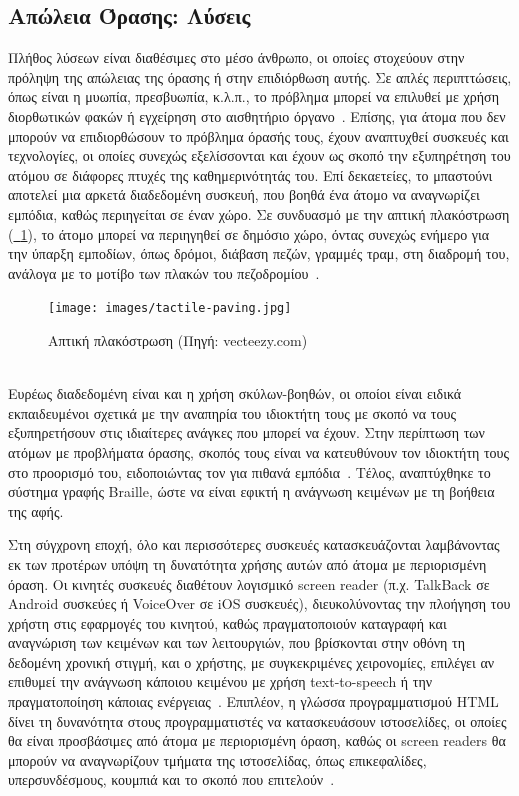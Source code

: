 \subsection{Απώλεια Όρασης: Λύσεις}\label{subsec:visionSolutions}
Πλήθος λύσεων είναι διαθέσιμες στο μέσο άνθρωπο, οι οποίες στοχεύουν στην πρόληψη της απώλειας της όρασης ή στην επιδιόρθωση αυτής. Σε απλές περιπττώσεις, όπως είναι η μυωπία, πρεσβυωπία, κ.λ.π., το πρόβλημα μπορεί να επιλυθεί με χρήση διορθωτικών φακών ή εγχείρηση στο αισθητήριο όργανο~\cite{worldhealthorganization_2023_blindness}. Επίσης, για άτομα που δεν μπορούν να επιδιορθώσουν το πρόβλημα όρασής τους, έχουν αναπτυχθεί συσκευές και τεχνολογίες, οι οποίες συνεχώς εξελίσσονται και έχουν ως σκοπό την εξυπηρέτηση του ατόμου σε διάφορες πτυχές της καθημερινότητάς του. Επί δεκαετείες, το μπαστούνι αποτελεί μια αρκετά διαδεδομένη συσκευή, που βοηθά ένα άτομο να αναγνωρίζει εμπόδια, καθώς περιηγείται σε έναν χώρο. Σε συνδυασμό με την απτική πλακόστρωση (\hyperref[fig:tactile_paving]{\schema~\ref*{fig:tactile_paving}}), το άτομο μπορεί να περιηγηθεί σε δημόσιο χώρο, όντας συνεχώς ενήμερο για την ύπαρξη εμποδίων, όπως δρόμοι, διάβαση πεζών, γραμμές τραμ, στη διαδρομή του, ανάλογα με το μοτίβο των πλακών του πεζοδρομίου~\cite{mashiata_2022_towards}.
\begin{figure}[!h]
  \centering
  \texttt{[image: images/tactile-paving.jpg]}
  \caption{Απτική πλακόστρωση {\footnotesize(Πηγή: vecteezy.com)}}\label{fig:tactile_paving}
\end{figure}\\
Ευρέως διαδεδομένη είναι και η χρήση σκύλων-βοηθών, οι οποίοι είναι ειδικά εκπαιδευμένοι σχετικά με την αναπηρία του ιδιοκτήτη τους με σκοπό να τους εξυπηρετήσουν στις ιδιαίτερες ανάγκες που μπορεί να έχουν. Στην περίπτωση των ατόμων με προβλήματα όρασης, σκοπός τους είναι να κατευθύνουν τον ιδιοκτήτη τους στο προορισμό του, ειδοποιώντας τον για πιθανά εμπόδια~\cite{illinoisuniversitylibrary_2013_libguides}. Τέλος, αναπτύχθηκε το σύστημα γραφής Braille, ώστε να είναι εφικτή η ανάγνωση κειμένων με τη βοήθεια της αφής.

Στη σύγχρονη εποχή, όλο και περισσότερες συσκευές κατασκευάζονται λαμβάνοντας εκ των προτέρων υπόψη τη δυνατότητα χρήσης αυτών από άτομα με περιορισμένη όραση. Οι κινητές συσκευές διαθέτουν λογισμικό screen reader (π.χ. TalkBack σε Android συσκεύες ή VoiceOver σε iOS συσκευές), διευκολύνοντας την πλοήγηση του χρήστη στις εφαρμογές του κινητού, καθώς πραγματοποιούν καταγραφή και αναγνώριση των κειμένων και των λειτουργιών, που βρίσκονται στην οθόνη τη δεδομένη χρονική στιγμή, και ο χρήστης, με συγκεκριμένες χειρονομίες, επιλέγει αν επιθυμεί την ανάγνωση κάποιου κειμένου με χρήση text-to-speech ή την πραγματοποίηση κάποιας ενέργειας~\cite{americanfoundationfortheblind_2019_screen}. Επιπλέον, η γλώσσα προγραμματισμού HTML δίνει τη δυνανότητα στους προγραμματιστές να κατασκευάσουν ιστοσελίδες, οι οποίες θα είναι προσβάσιμες από άτομα με περιορισμένη όραση, καθώς οι screen readers θα μπορούν να αναγνωρίζουν τμήματα της ιστοσελίδας, όπως επικεφαλίδες, υπερσυνδέσμους, κουμπιά και το σκοπό που επιτελούν~\cite{w3schools_2020_html}.

